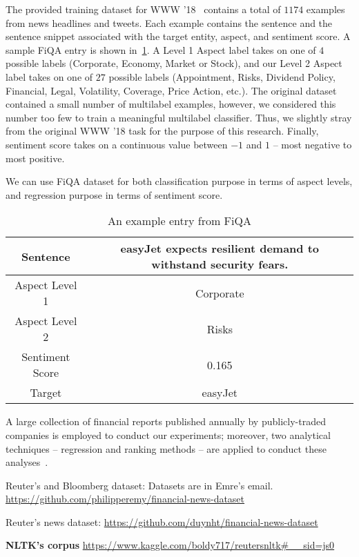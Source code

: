 \documentclass[11pt]{article}
\begin{document}
The provided training dataset for WWW ’18~\cite{maia2018} contains a
total of $1174$ examples from news headlines and tweets. Each example
contains the sentence and the sentence snippet associated with the target entity, aspect, and sentiment score. A
sample FiQA entry is shown in~\ref{tab:fiqa_example}. A Level 1 Aspect
label takes on one of $4$ possible labels (Corporate, Economy, Market or Stock), and our Level 2 Aspect label takes on
one of $27$ possible labels (Appointment, Risks, Dividend Policy, Financial, Legal, Volatility, Coverage, Price Action, etc.). The original
dataset contained a small number of multilabel examples, however, we considered this number
too few to train a meaningful multilabel classifier. Thus, we slightly
stray from the original WWW ’18 task for the purpose of this research. Finally, sentiment score takes on a continuous value between $-1$ and $1$ – most negative to most positive.

We can use FiQA dataset for both classification purpose in terms of aspect levels, and regression purpose in terms of sentiment score.

\begin{table}
  \begin{tabular}{|c|c|}
    \hline 
 Sentence & easyJet expects resilient demand to withstand security
            fears. \\ \hline
Aspect Level 1 &  Corporate \\ \hline 
Aspect Level 2 & Risks \\ \hline 
Sentiment Score & 0.165 \\ \hline 
Target & easyJet \\ \hline 
\end{tabular}
\caption{An example entry from FiQA}
\label{tab:fiqa_example}
\end{table}

A large collection of financial reports published annually by publicly-traded companies is employed to conduct our experiments;
moreover, two analytical techniques – regression and ranking methods –
are applied to conduct these analyses~\cite{xxx}.

Reuter's and Bloomberg dataset: Datasets are in Emre's email.
\url{https://github.com/philipperemy/financial-news-dataset}

Reuter's news dataset:
\url{https://github.com/duynht/financial-news-dataset}

\textbf{NLTK's corpus}
\url{https://www.kaggle.com/boldy717/reutersnltk#__sid=js0}
\end{document}

